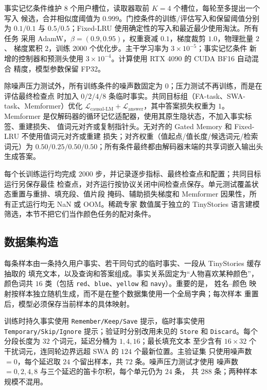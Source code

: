\documentclass[letterpaper]{article}
\begin{document}
事实记忆条件维护 $8$ 个用户槽位，读取器取前 $K=4$ 个槽位，每轮至多提出一个写入
候选，合并相似度阈值为 $0.999$。门控条件的训练/评估写入和保留阈值分别为
$0.1/0.1$ 与 $0.5/0.5$；Fixed-LRU 使用确定性的写入和最近最少使用淘汰。所有任务
采用 AdamW，$\beta=(0.9,0.95)$，权重衰减 $0.1$，梯度裁剪 $1.0$，物理批量 $2$、
梯度累积 $2$，训练 $2000$ 个优化步。主干学习率为 $3\times10^{-5}$；事实记忆条件
新增的控制器和预测头使用 $3\times10^{-4}$。计算使用 RTX 4090 的 CUDA BF16 自动混合
精度，模型参数保留 FP32。

除噪声压力测试外，所有训练条件的噪声数固定为 $0$；压力测试不再训练，而是在评估最终检查点
时加入 $0/2/4/8$ 条临时事实。共同目标组（FA-task、SWA-task、Memformer）优化
$\mathcal{L}_{\mathrm{causal\text{-}LM}}+\mathcal{L}_{\mathrm{answer}}$，其中答案损失权重为 $1$。
Memformer 是仅解码器的循环记忆适配器，使用其原生隐状态，不加入事实标签、重建损失、
值词元对齐或复制指针头。无对齐的 Gated Memory 和 Fixed-LRU 不使用值词元对齐或重建
损失；对齐权重（值起点/值长度/候选词元/检索词元）为
$0.50/0.25/0.50/0.50$；所有条件最终都由解码器末端的共享词嵌入输出头生成答案。

每个长训练运行均完成 $2000$ 步，并记录逐步指标、最终检查点和配置；共同目标运行另保存最佳
检查点，对齐运行按协议关闭中间检查点保存。单元测试覆盖状态重置与重排、填充段、值片段
掩码、辅助损失梯度和 Memformer 因果性，所有正式运行均无 NaN 或 OOM。稀疏专家
数值属于独立的 TinyStories 语言建模筛选，本节不把它们当作颜色任务的配对条件。

\subsection{数据集构造}

每条样本由一条持久用户事实、若干同句式的临时事实、一段从 TinyStories 缓存抽取的
填充文本，以及查询和答案组成。事实关系固定为“人物喜欢某种颜色”，颜色词共 $16$
类（包括 \texttt{red}、\texttt{blue}、\texttt{yellow} 和 \texttt{navy}）。重要的是，
姓名--颜色 映射按样本独立随机生成，而不是在整个数据集使用一个全局字典；每次样本
重置后，模型必须保存当前样本的具体映射。

训练时持久事实使用 \texttt{Remember/Keep/Save} 提示，临时事实使用
\texttt{Temporary/Skip/Ignore} 提示；验证时分别改用未见的 \texttt{Store} 和
\texttt{Discard}。每个分段长度为 $32$ 个词元，延迟分桶为 $1,4,16$；最长填充文本
至少含有 $16\times32$ 个干扰词元，连同轮边界远超 SWA 的 $124$ 个最新位置。主验证集
只使用噪声数 $=0$，每个延迟取 $24$ 个留出样本，共 $72$ 条。噪声压力测试才使用
噪声数 $=0,2,4,8$ 与三个延迟的笛卡尔积，每个单元仍为 $24$ 条，
共 $288$ 条；两种样本规模不混用。
\end{document}

